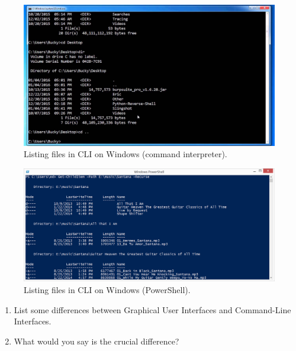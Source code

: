 \begin{frame}
  \begin{figure}
    \includegraphics[height=0.8\textheight]{fig/dir.jpg}
    \caption{Listing files in CLI on Windows (command interpreter).}
  \end{figure}
\end{frame}

\begin{frame}
  \begin{figure}
    \includegraphics[width=\columnwidth]{fig/GetChildItem.png}
    \caption{Listing files in CLI on Windows (PowerShell).}
  \end{figure}
\end{frame}

\begin{frame}
  \begin{exercise}
    \begin{enumerate}
      \item List some differences between Graphical User Interfaces and 
        Command-Line Interfaces.
      \item What would you say is the crucial difference?
    \end{enumerate}
  \end{exercise}
\end{frame}

